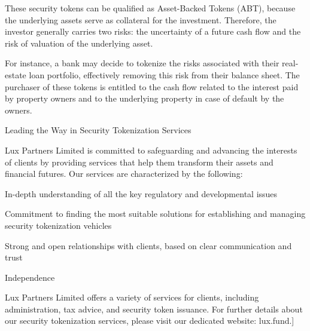\documentclass[11pt]{article}
\begin{document}
These security tokens can be qualified as Asset-Backed Tokens (ABT), because the underlying assets serve as collateral for the investment. Therefore, the investor generally carries two risks: the uncertainty of a future cash flow and the risk of valuation of the underlying asset.


For instance, a bank may decide to tokenize the risks associated with their real-estate loan portfolio, effectively removing this risk from their balance sheet. The purchaser of these tokens is entitled to the cash flow related to the interest paid by property owners and to the underlying property in case of default by the owners.


Leading the Way in Security Tokenization Services


Lux Partners Limited is committed to safeguarding and advancing the interests of clients by providing services that help them transform their assets and financial futures. Our services are characterized by the following:


In-depth understanding of all the key regulatory and developmental issues


Commitment to finding the most suitable solutions for establishing and managing security tokenization vehicles


Strong and open relationships with clients, based on clear communication and trust


Independence


Lux Partners Limited offers a variety of services for clients, including administration, tax advice, and security token issuance. For further details about our security tokenization services, please visit our dedicated website: lux.fund.]
\end{document}
